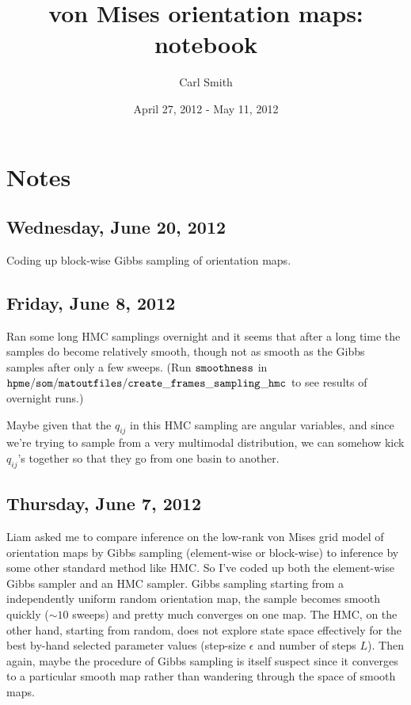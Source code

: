 \documentclass[11pt]{article}
\begin{document}
\title{von Mises orientation maps: notebook}
\author{Carl Smith}
\date{April 27, 2012 - May 11, 2012}
\maketitle

\section*{Notes}

\subsection*{Wednesday, June 20, 2012}
Coding up block-wise Gibbs sampling of orientation maps.

\subsection*{Friday, June 8, 2012}
Ran some long HMC samplings overnight and it seems that after a long time the samples do become relatively smooth, though not as smooth as the Gibbs samples after only a few sweeps. (Run $\tt{smoothness}$ in $\tt{hpme/som/matoutfiles/create\_frames\_sampling\_hmc}$ to see results of overnight runs.)

Maybe given that the $q_{ij}$ in this HMC sampling are angular variables, and since we're trying to sample from a very multimodal distribution, we can somehow kick $q_{ij}$'s together so that they go from one basin to another.

\subsection*{Thursday, June 7, 2012}
Liam asked me to compare inference on the low-rank von Mises grid model of orientation maps by Gibbs sampling (element-wise or block-wise) to inference by some other standard method like HMC. So I've coded up both the element-wise Gibbs sampler and an HMC sampler. Gibbs sampling starting from a independently uniform random orientation map, the sample becomes smooth quickly ($\sim10$ sweeps) and pretty much converges on one map. The HMC, on the other hand, starting from random, does not explore state space effectively for the best by-hand selected parameter values (step-size $\epsilon$ and number of steps $L$). Then again, maybe the procedure of Gibbs sampling is itself suspect since it converges to a particular smooth map rather than wandering through the space of smooth maps.
\end{document}
